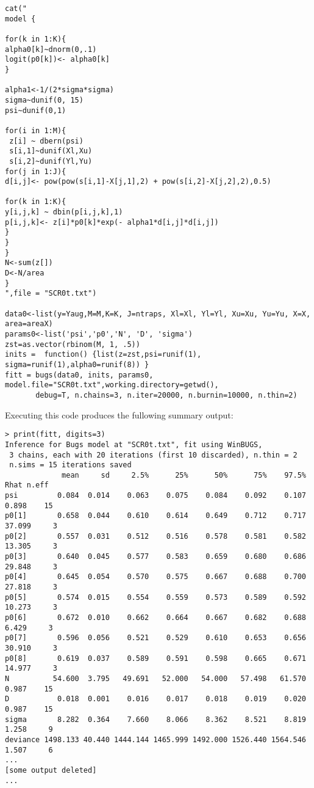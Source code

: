 {\small
\begin{verbatim}
cat("
model {

for(k in 1:K){
alpha0[k]~dnorm(0,.1)
logit(p0[k])<- alpha0[k]
}

alpha1<-1/(2*sigma*sigma)
sigma~dunif(0, 15)
psi~dunif(0,1)

for(i in 1:M){
 z[i] ~ dbern(psi)
 s[i,1]~dunif(Xl,Xu)
 s[i,2]~dunif(Yl,Yu)
for(j in 1:J){
d[i,j]<- pow(pow(s[i,1]-X[j,1],2) + pow(s[i,2]-X[j,2],2),0.5)

for(k in 1:K){
y[i,j,k] ~ dbin(p[i,j,k],1)
p[i,j,k]<- z[i]*p0[k]*exp(- alpha1*d[i,j]*d[i,j])
}
}
}
N<-sum(z[])
D<-N/area
}
",file = "SCR0t.txt")

data0<-list(y=Yaug,M=M,K=K, J=ntraps, Xl=Xl, Yl=Yl, Xu=Xu, Yu=Yu, X=X, area=areaX)
params0<-list('psi','p0','N', 'D', 'sigma')
zst=as.vector(rbinom(M, 1, .5))
inits =  function() {list(z=zst,psi=runif(1), sigma=runif(1),alpha0=runif(8)) }
fitt = bugs(data0, inits, params0, model.file="SCR0t.txt",working.directory=getwd(),    
       debug=T, n.chains=3, n.iter=20000, n.burnin=10000, n.thin=2)
\end{verbatim}
}

Executing this code produces the fullowing summary output:
{\small 
\begin{verbatim}
> print(fitt, digits=3)
Inference for Bugs model at "SCR0t.txt", fit using WinBUGS,
 3 chains, each with 20 iterations (first 10 discarded), n.thin = 2
 n.sims = 15 iterations saved
             mean     sd     2.5%      25%      50%      75%    97.5%   Rhat n.eff
psi         0.084  0.014    0.063    0.075    0.084    0.092    0.107  0.898    15
p0[1]       0.658  0.044    0.610    0.614    0.649    0.712    0.717 37.099     3
p0[2]       0.557  0.031    0.512    0.516    0.578    0.581    0.582 13.305     3
p0[3]       0.640  0.045    0.577    0.583    0.659    0.680    0.686 29.848     3
p0[4]       0.645  0.054    0.570    0.575    0.667    0.688    0.700 27.818     3
p0[5]       0.574  0.015    0.554    0.559    0.573    0.589    0.592 10.273     3
p0[6]       0.672  0.010    0.662    0.664    0.667    0.682    0.688  6.429     3
p0[7]       0.596  0.056    0.521    0.529    0.610    0.653    0.656 30.910     3
p0[8]       0.619  0.037    0.589    0.591    0.598    0.665    0.671 14.977     3
N          54.600  3.795   49.691   52.000   54.000   57.498   61.570  0.987    15
D           0.018  0.001    0.016    0.017    0.018    0.019    0.020  0.987    15
sigma       8.282  0.364    7.660    8.066    8.362    8.521    8.819  1.258     9
deviance 1498.133 40.440 1444.144 1465.999 1492.000 1526.440 1564.546  1.507     6
...
[some output deleted]
...
\end{verbatim}
}






